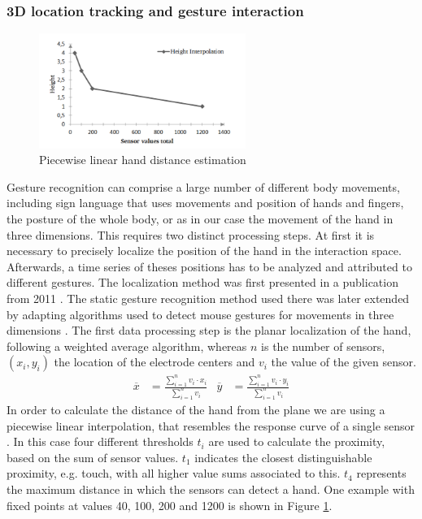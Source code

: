 \subsubsection{3D location tracking and gesture interaction}
 \begin{figure}[h]
\centering
\includegraphics[width=0.6\textwidth]{images/magicbox_data_zaxis}
\caption{Piecewise linear hand distance estimation \cite{Braun2011MultiInputDevice}}
\label{fig:magicbox_data_zaxis}
\end{figure}
Gesture recognition can comprise a large number of different body movements, including sign language that uses movements and position of hands and fingers, the posture of the whole body, or as in our case the movement of the hand in three dimensions. This requires two distinct processing steps. At first it is necessary to precisely localize the position of the hand in the interaction space. Afterwards, a time series of theses positions has to be analyzed and attributed to different gestures. The localization method was first presented in a publication from 2011 \cite{Braun2011MultiInputDevice}. The static gesture recognition method used there was later extended by adapting algorithms used to detect mouse gestures for movements in three dimensions \cite{braun2013capacitive}. 
The first data processing step is the planar localization of the hand, following a weighted average algorithm, whereas $n$ is the number of sensors, $(x_i, y_i)$ the location of the electrode centers and $v_i$ the value of the given sensor.
\begin{align}
\overline{x}&=\frac{\sum^n_{i=1}{v_i\cdot x_i}}{\sum^n_{i=1}{v_i}} & \overline{y}&=\frac{\sum^n_{i=1}{v_i\cdot y_i}}{\sum^n_{i=1}{v_i}}
\end{align}
In order to calculate the distance of the hand from the plane we are using a piecewise linear interpolation, that resembles the response curve of a single sensor \cite{Braun2011MultiInputDevice}. In this case four different thresholds $t_i$ are used to calculate the proximity, based on the sum of sensor values. $t_1$ indicates the closest distinguishable proximity, e.g. touch, with all higher value sums associated to this. $t_4$ represents the maximum distance in which the sensors can detect a hand. One example with fixed points at values 40, 100, 200 and 1200 is shown in Figure \ref{fig:magicbox_data_zaxis}.
